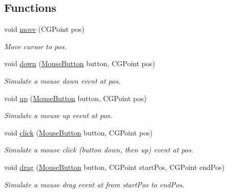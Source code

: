 \subsection*{Functions}
\begin{DoxyCompactItemize}
\item 
void \hyperlink{namespaceosx_1_1mouse_a96fc2b2983c0d9ee610ca9404ccc0506}{move} (C\-G\-Point pos)
\begin{DoxyCompactList}\small\item\em Move cursor to {\ttfamily pos}. \end{DoxyCompactList}\item 
void \hyperlink{namespaceosx_1_1mouse_af6a13b95720ba5d280a64dc3c169c4ab}{down} (\hyperlink{namespaceosx_1_1mouse_a025e93cf6af5808e4c8c2525fc668499}{Mouse\-Button} button, C\-G\-Point pos)
\begin{DoxyCompactList}\small\item\em Simulate a mouse down event at {\ttfamily pos}. \end{DoxyCompactList}\item 
void \hyperlink{namespaceosx_1_1mouse_a653d01ba6a07d9a07581934e80cd5138}{up} (\hyperlink{namespaceosx_1_1mouse_a025e93cf6af5808e4c8c2525fc668499}{Mouse\-Button} button, C\-G\-Point pos)
\begin{DoxyCompactList}\small\item\em Simulate a mouse up event at {\ttfamily pos}. \end{DoxyCompactList}\item 
void \hyperlink{namespaceosx_1_1mouse_af0b3d4b3af410086362a3faaff78d3b6}{click} (\hyperlink{namespaceosx_1_1mouse_a025e93cf6af5808e4c8c2525fc668499}{Mouse\-Button} button, C\-G\-Point pos)
\begin{DoxyCompactList}\small\item\em Simulate a mouse click (button down, then up) event at {\ttfamily pos}. \end{DoxyCompactList}\item 
void \hyperlink{namespaceosx_1_1mouse_ac87df58c78bf4f2ed44eb74a272a155e}{drag} (\hyperlink{namespaceosx_1_1mouse_a025e93cf6af5808e4c8c2525fc668499}{Mouse\-Button} button, C\-G\-Point start\-Pos, C\-G\-Point end\-Pos)
\begin{DoxyCompactList}\small\item\em Simulate a mouse drag event at from {\ttfamily start\-Pos} to {\ttfamily end\-Pos}. \end{DoxyCompactList}\end{DoxyCompactItemize}


